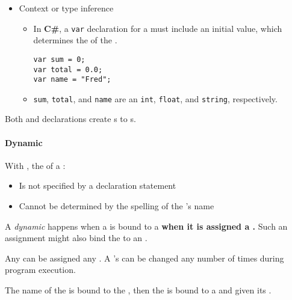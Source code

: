 \begin{itemize}[noitemsep]
\item Context or type inference
  \begin{itemize}[noitemsep]
  \item In \textbf{C\#}, a \texttt{var} declaration for a  must include an initial value, which determines the  of the .
\begin{verbatim}
var sum = 0;
var total = 0.0;
var name = "Fred";
\end{verbatim}
  \item \texttt{sum}, \texttt{total}, and \texttt{name} are an \texttt{int}, \texttt{float}, and \texttt{string}, respectively.
  \end{itemize}
\end{itemize}

\begin{remark*}
  Both  and  declarations create  s to s.
\end{remark*}

\paragraph{Dynamic  }\label{par:Dynamic_Variable_Type_Binding}
With , the  of a :
\begin{itemize}[noitemsep]
\item Is not specified by a declaration statement
\item Cannot be determined by the spelling of the 's name
\end{itemize}

\begin{definition}[Dynamic]\label{def:Dynamic_Variable_Type_Binding}
  A \emph{dynamic}  happens when a  is bound to a  \textbf{when it is assigned a .}
  Such an assignment might also bind the  to an .

  Any  can be assigned any .
  A 's  can be changed any number of times during program execution.

  The name of the  is bound to the , then the  is bound to a  and given its .
\end{definition}

